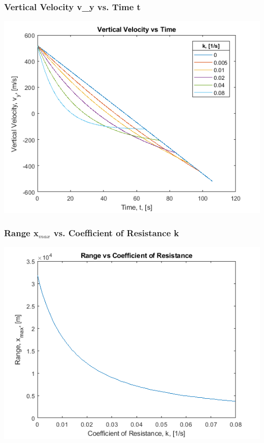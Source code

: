 \documentclass[oneside]{article}
\begin{document}
\subsubsection{Vertical Velocity v\_y vs. Time t}
\includegraphics [width=\linewidth*4/5]{graph_v-t.png}
\subsubsection{Range x$_{max}$ vs. Coefficient of Resistance k}
\includegraphics [width=\linewidth*4/5]{graph_x-k.png}
\end{document}
